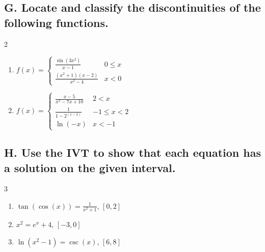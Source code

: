 \documentclass{article}
\begin{document}
\subsection*{G. Locate and classify the discontinuities of the following functions.}
\begin{multicols}{2}
\begin{enumerate}
\item $f(x)=\begin{cases}
\displaystyle\frac{\sin(3x^2)}{x-1}& 0\leq x\\[1em]
\displaystyle\frac{(x^2+1)(x-2)}{x^2-4} & x < 0
\end{cases}$
\item $f(x)=\begin{cases}
\displaystyle\frac{x-5}{x^{2}-7x+10} & 2<x\\[1em]
\displaystyle\frac{1}{1-2^{\left(x-2\right)}} & -1\leq x <2 \\[1em]
\displaystyle \ln\left(-x\right) & x < -1\end{cases}$
\end{enumerate}
\end{multicols}

\subsection*{H. Use the IVT to show that each equation has a solution on the given interval.}
\begin{multicols}{3}
\begin{enumerate}
    \item $\tan\left(\cos\left(x\right)\right)=\frac{1}{x^{2}+1}$, $[0, 2]$
    \item $x^{2}=e^{x}+4$, $[-3,0]$
    \item $\ln\left(x^{2}-1\right)=\csc\left(x\right)$, $[6,8]$
\end{enumerate}
\end{multicols}




\end{document}
